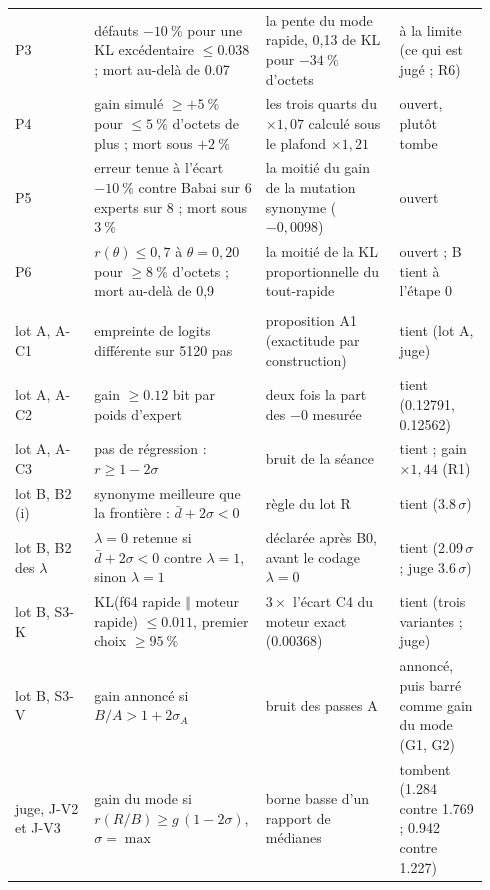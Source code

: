 \begin{longtable}{@{}>{\raggedright\arraybackslash}p{0.16\linewidth}>{\raggedright\arraybackslash}p{0.33\linewidth}>{\raggedright\arraybackslash}p{0.27\linewidth}>{\raggedright\arraybackslash}p{0.18\linewidth}@{}}
P3 & défauts $-\SI{10}{\percent}$ pour une KL excédentaire $\le \num{0.038}$ ; mort au-delà de \num{0.07} & la pente du mode rapide, 0,13 de KL pour $-\SI{34}{\percent}$ d'octets & à la limite (ce qui est jugé ; R6) \\
P4 & gain simulé $\ge +\SI{5}{\percent}$ pour $\le \SI{5}{\percent}$ d'octets de plus ; mort sous $+\SI{2}{\percent}$ & les trois quarts du $\times 1{,}07$ calculé sous le plafond $\times 1{,}21$ & ouvert, plutôt tombe \\
P5 & erreur tenue à l'écart $-\SI{10}{\percent}$ contre Babai sur 6 experts sur 8 ; mort sous $\SI{3}{\percent}$ & la moitié du gain de la mutation synonyme ($-0{,}0098$) & ouvert \\
P6 & $r(\theta) \le 0{,}7$ à $\theta = 0{,}20$ pour $\ge \SI{8}{\percent}$ d'octets ; mort au-delà de 0,9 & la moitié de la KL proportionnelle du tout-rapide & ouvert ; B tient à l'étape 0 \\
\multicolumn{4}{@{}l}{\textsf{\bfseries La construction (ch.~\ref{t3cod:ch} à~\ref{t3jug:ch})}} \\
lot A, A-C1 & 0 empreinte de logits différente sur \num{5120} pas & proposition A1 (exactitude par construction) & tient (lot A, juge) \\
lot A, A-C2 & gain $\ge \num{0.12}$ bit par poids d'expert & deux fois la part des $-0$ mesurée & tient (\num{0.12791}, \num{0.12562}) \\
lot A, A-C3 & pas de régression : $r \ge 1 - 2\sigma$ & bruit de la séance & tient ; gain $\times 1{,}44$ (R1) \\
lot B, B2 (i) & synonyme meilleure que la frontière : $\bar d + 2\sigma < 0$ & règle du lot R & tient (\num{3.8}\,$\sigma$) \\
lot B, B2 des $\lambda$ & $\lambda = 0$ retenue si $\bar d + 2\sigma < 0$ contre $\lambda = 1$, sinon $\lambda = 1$ & déclarée après B0, avant le codage $\lambda = 0$ & tient (\num{2.09}\,$\sigma$ ; juge \num{3.6}\,$\sigma$) \\
lot B, S3-K & KL(f64 rapide $\Vert$ moteur rapide) $\le \num{0.011}$, premier choix $\ge \SI{95}{\percent}$ & $3 \times$ l'écart C4 du moteur exact (\num{0.00368}) & tient (trois variantes ; juge) \\
lot B, S3-V & gain annoncé si $B/A > 1 + 2\sigma_A$ & bruit des passes A & annoncé, puis barré comme gain du mode (G1, G2) \\
juge, J-V2 et J-V3 & gain du mode si $r(R/B) \ge g\,(1 - 2\sigma)$, $\sigma = \max$ & borne basse d'un rapport de médianes & tombent (\num{1.284} contre \num{1.769} ; \num{0.942} contre \num{1.227}) \\

\end{longtable}
